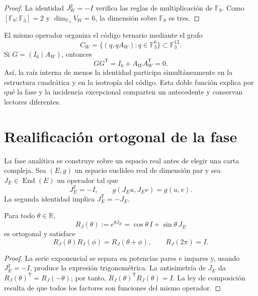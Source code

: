 \begin{proof}
La identidad \(J_W^2=-I\) verifica las reglas de multiplicación de
\(\mathbb F_9\). Como
\([\mathbb F_9:\mathbb F_3]=2\) y
\(\dim_{\mathbb F_3}V_W=6\), la dimensión sobre \(\mathbb F_9\) es tres.
\end{proof}

El mismo operador organiza el código ternario mediante el grafo
\begin{equation}
 C_W=\{(q,qA_W):q\in\mathbb F_3^6\}\subset\mathbb F_3^{12}.
 \label{eq:codigo-grafo-J-anexo}
\end{equation}
Si \(G=(I_6\mid A_W)\), entonces
\[
 GG^{\mathsf T}=I_6+A_W A_W^{\mathsf T}=0.
\]
Así, la raíz interna de menos la identidad participa simultáneamente en la
estructura cuadrática y en la isotropía del código. Esta doble función explica
por qué la fase y la incidencia excepcional comparten un antecedente y
conservan lectores diferentes.

\section{Realificación ortogonal de la fase}

La fase analítica se construye sobre un espacio real antes de elegir una carta
compleja. Sea \((E,g)\) un espacio euclídeo real de dimensión par y sea
\(J_E\in\operatorname{End}(E)\) un operador tal que
\begin{equation}
 J_E^2=-I,
 \qquad
 g(J_Eu,J_Ev)=g(u,v).
 \label{eq:estructura-compleja-ortogonal-anexo}
\end{equation}
La segunda identidad implica \(J_E^{\mathsf T}=-J_E\).

\begin{proposition}
\label{prop:fase-ortogonal-J-anexo}
Para todo \(\theta\in\mathbb R\),
\begin{equation}
 R_J(\theta):=e^{\theta J_E}
 =\cos\theta\,I+\sin\theta\,J_E
 \label{eq:rotacion-J-anexo}
\end{equation}
es ortogonal y satisface
\begin{equation}
 R_J(\theta)R_J(\phi)=R_J(\theta+\phi),
 \qquad R_J(2\pi)=I.
 \label{eq:grupo-fase-J-anexo}
\end{equation}
\end{proposition}

\begin{proof}
La serie exponencial se separa en potencias pares e impares y, usando
\(J_E^2=-I\), produce la expresión trigonométrica. La antisimetría de
\(J_E\) da
\(R_J(\theta)^{\mathsf T}=R_J(-\theta)\); por tanto,
\(R_J(\theta)^{\mathsf T}R_J(\theta)=I\). La ley de composición resulta de
que todos los factores son funciones del mismo operador.
\end{proof}

